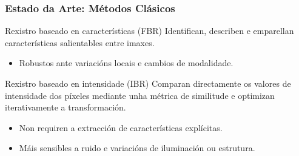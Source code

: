 \documentclass[xcolor=dvipsnames]{beamer}
\begin{document}
\begin{frame}
\frametitle{Estado da Arte: Métodos Clásicos}
\begin{block}{Rexistro baseado en características (FBR)}
Identifican, describen e emparellan características salientables entre imaxes.
\begin{itemize}
\item Robustos ante variacións locais e cambios de modalidade.
\end{itemize}
\end{block}

\begin{block}{Rexistro baseado en intensidade (IBR)}
    Comparan directamente os valores de intensidade dos píxeles mediante unha métrica de similitude e optimizan iterativamente a transformación.
    \begin{itemize}
        \item  Non requiren a extracción de características explícitas.
        \item  Máis sensibles a ruido e variacións de iluminación ou estrutura.
    \end{itemize}
\end{block}




\end{frame}
\end{document}
